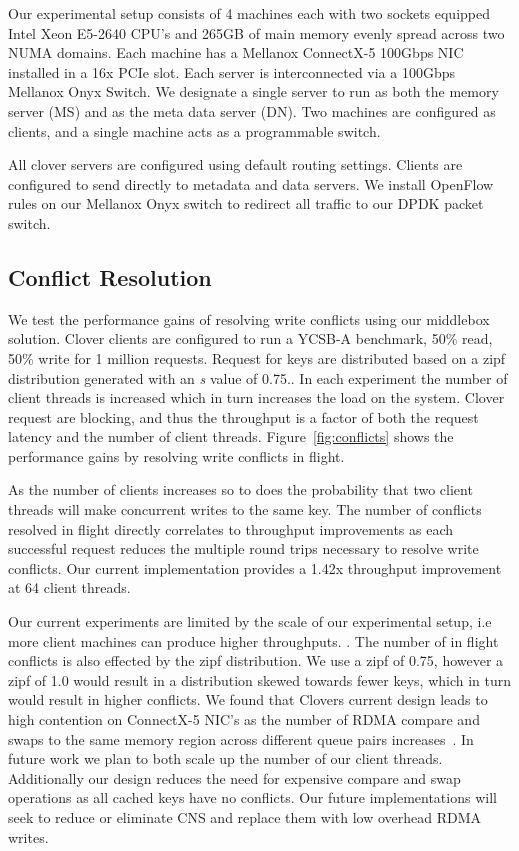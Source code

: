 Our experimental setup consists of 4 machines each with two sockets
equipped Intel Xeon E5-2640 CPU's and 265GB of main memory evenly
spread across two NUMA domains. Each machine has a Mellanox ConnectX-5
100Gbps NIC installed in a 16x PCIe slot. Each server is
interconnected via a 100Gbps Mellanox Onyx Switch. We designate a
single server to run as both the memory server (MS) and as the meta
data server (DN). Two machines are configured as clients, and a single
machine acts as a programmable switch.

All clover servers are configured using default routing settings.
Clients are configured to send directly to metadata and data servers.
We install OpenFlow rules on our Mellanox Onyx switch to redirect all
traffic to our DPDK packet switch.

\subsection{Conflict Resolution}

We test the performance gains of resolving write conflicts using our
middlebox solution. Clover clients are configured to run a YCSB-A
benchmark, 50\% read, 50\% write for 1 million requests. Request for
keys are distributed based on a zipf distribution generated with an
\textit{s} value of 0.75.. In each
experiment the number of client threads is increased which in turn
increases the load on the system. Clover request are blocking, and
thus the throughput is a factor of both the request latency and the
number of client threads. Figure~\ref{fig:conflicts} shows the
performance gains by resolving write conflicts in flight.

As the number of clients increases so to does the probability that two
client threads will make concurrent writes to the same key. The number
of conflicts resolved in flight directly correlates to throughput
improvements as each successful request reduces the multiple round
trips necessary to resolve write conflicts. Our current implementation
provides a 1.42x throughput improvement at 64 client threads.

Our current experiments are limited by the scale of our experimental
setup, i.e more client machines can produce higher throughputs.
. 
The number of in flight conflicts is also effected by the zipf
distribution. We use a zipf of 0.75, however a zipf of 1.0 would
result in a distribution skewed towards fewer keys, which in turn
would result in higher conflicts. We found that Clovers current design
leads to high contention on ConnectX-5 NIC's as the number of RDMA
compare and swaps to the same memory region across different queue
pairs increases~\cite{design-guidelines}. In future work we plan to
both scale up the number of our client threads. Additionally our
design reduces the need for expensive compare and swap operations as
all cached keys have no conflicts. Our future implementations will
seek to reduce or eliminate CNS and replace them with low overhead
RDMA writes.

